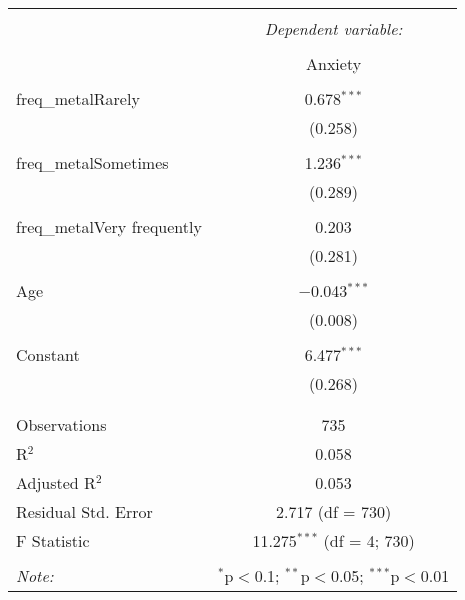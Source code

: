 \documentclass{article}
\begin{document}
\begin{table}[!htbp] \centering 
  \caption{} 
  \label{} 
\begin{tabular}{@{\extracolsep{5pt}}lc} 
\\[-1.8ex]\hline 
\hline \\[-1.8ex] 
 & \multicolumn{1}{c}{\textit{Dependent variable:}} \\ 
\cline{2-2} 
\\[-1.8ex] & Anxiety \\ 
\hline \\[-1.8ex] 
 freq\_metalRarely & 0.678$^{***}$ \\ 
  & (0.258) \\ 
  & \\ 
 freq\_metalSometimes & 1.236$^{***}$ \\ 
  & (0.289) \\ 
  & \\ 
 freq\_metalVery frequently & 0.203 \\ 
  & (0.281) \\ 
  & \\ 
 Age & $-$0.043$^{***}$ \\ 
  & (0.008) \\ 
  & \\ 
 Constant & 6.477$^{***}$ \\ 
  & (0.268) \\ 
  & \\ 
\hline \\[-1.8ex] 
Observations & 735 \\ 
R$^{2}$ & 0.058 \\ 
Adjusted R$^{2}$ & 0.053 \\ 
Residual Std. Error & 2.717 (df = 730) \\ 
F Statistic & 11.275$^{***}$ (df = 4; 730) \\ 
\hline 
\hline \\[-1.8ex] 
\textit{Note:}  & \multicolumn{1}{r}{$^{*}$p$<$0.1; $^{**}$p$<$0.05; $^{***}$p$<$0.01} \\ 
\end{tabular} 
\end{table}
\end{document}
